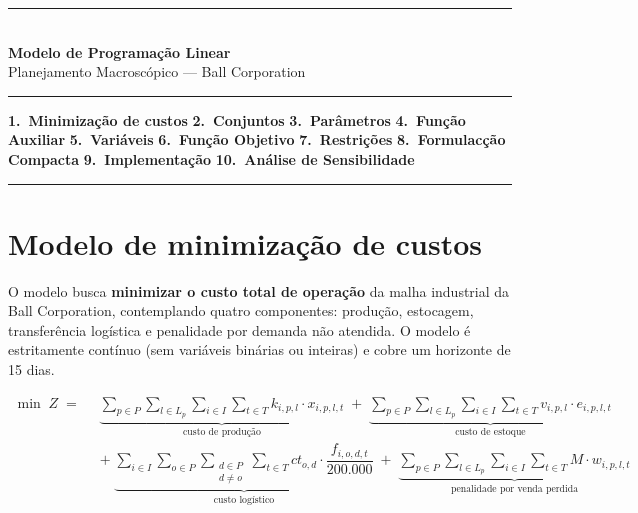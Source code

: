 \documentclass[12pt, a4paper]{article}
\begin{document}
\begin{center}
  {\color{ballblue}\rule{\linewidth}{2pt}}\\[8pt]
  {\LARGE\bfseries Modelo de Programa\c{c}\~{a}o Linear}\\[4pt]
  {\large\color{darkgray} Planejamento Macrosc\'{o}pico --- Ball Corporation}\\[8pt]
  {\color{ballblue}\rule{\linewidth}{2pt}}
\end{center}

\vspace{10pt}
\begin{center}
  \small\color{darkgray}
  \textbf{1.~Minimiza\c{c}\~{a}o de custos}
  \enspace\textbullet\enspace
  \textbf{2.~Conjuntos}
  \enspace\textbullet\enspace
  \textbf{3.~Par\^{a}metros}
  \enspace\textbullet\enspace
  \textbf{4.~Fun\c{c}\~{a}o Auxiliar}
  \enspace\textbullet\enspace
  \textbf{5.~Vari\'{a}veis}
  \enspace\textbullet\enspace
  \textbf{6.~Fun\c{c}\~{a}o Objetivo}
  \enspace\textbullet\enspace
  \textbf{7.~Restri\c{c}\~{o}es}
  \enspace\textbullet\enspace
  \textbf{8.~Formulac\c{c}\~{a}o Compacta}
  \enspace\textbullet\enspace
  \textbf{9.~Implementa\c{c}\~{a}o}
  \enspace\textbullet\enspace
  \textbf{10.~An\'{a}lise de Sensibilidade}
\end{center}
\vspace{4pt}
{\color{accentgray}\rule{\linewidth}{0.5pt}}

\section{Modelo de minimiza\c{c}\~{a}o de custos}

O modelo busca \textbf{minimizar o custo total de opera\c{c}\~{a}o} da malha industrial da Ball
Corporation, contemplando quatro componentes: produ\c{c}\~{a}o, estocagem, transfer\^{e}ncia
log\'{i}stica e penalidade por demanda n\~{a}o atendida. O modelo \'{e} estritamente cont\'{i}nuo
(sem vari\'{a}veis bin\'{a}rias ou inteiras) e cobre um horizonte de 15 dias.

\[
  \boxed{
    \begin{aligned}
      \min \; Z \;=\;\;
      & \underbrace{\sum_{p \in P}\sum_{l \in L_p}\sum_{i \in I}\sum_{t \in T}
          k_{i,p,l} \cdot x_{i,p,l,t}}_{\text{custo de produ\c{c}\~{a}o}}
        \;+\;
        \underbrace{\sum_{p \in P}\sum_{l \in L_p}\sum_{i \in I}\sum_{t \in T}
          v_{i,p,l} \cdot e_{i,p,l,t}}_{\text{custo de estoque}} \\[14pt]
      & +\;
        \underbrace{\sum_{i \in I}\sum_{o \in P}\sum_{\substack{d \in P \\ d \neq o}}\sum_{t \in T}
          ct_{o,d} \cdot \dfrac{f_{i,o,d,t}}{200{.}000}}_{\text{custo log\'{i}stico}}
        \;+\;
        \underbrace{\sum_{p \in P}\sum_{l \in L_p}\sum_{i \in I}\sum_{t \in T}
          M \cdot w_{i,p,l,t}}_{\text{penalidade por venda perdida}}
    \end{aligned}
  }
\]
\end{document}
